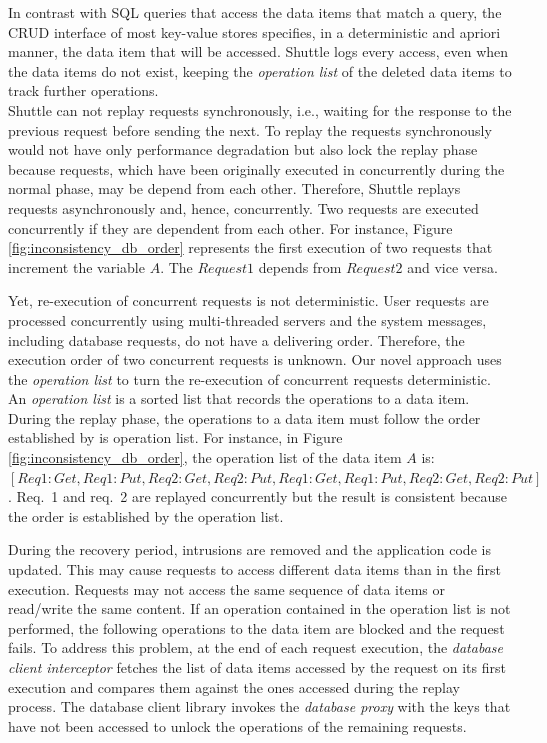 In contrast with SQL queries that access the data items that match a query, the \ac{CRUD} interface of most key-value stores specifies, in a deterministic and apriori manner, the data item that will be accessed. Shuttle logs every access, even when the data items do not exist, keeping the \emph{operation list} of the deleted data items to track further operations.\\


Shuttle can not replay requests synchronously, i.e., waiting for the response to the previous request before sending the next. To replay the requests synchronously would not have only performance degradation but also lock the replay phase because requests, which have been originally executed in concurrently during the normal phase, may be depend from each other. Therefore, Shuttle replays requests asynchronously and, hence, concurrently. Two requests are executed concurrently if they are dependent from each other. For instance, Figure \ref{fig:inconsistency_db_order} represents the first execution of two requests that increment the variable $A$. The $Request 1$ depends from $Request 2$ and vice versa. 

Yet, re-execution of concurrent requests is not deterministic. User requests are processed concurrently using multi-threaded servers and the system messages, including database requests, do not have a delivering order. Therefore, the execution order of two concurrent requests is unknown. Our novel approach uses the \emph{operation list} to turn the re-execution of concurrent requests deterministic. An \emph{operation list} is a sorted list that records the operations to a data item. During the replay phase, the operations to a data item must follow the order established by is operation list. For instance, in Figure \ref{fig:inconsistency_db_order}, the operation list of the data item $A$ is: $[Req1:Get, Req1:Put, Req2:Get, Req2:Put, Req1:Get, Req1:Put, Req2:Get, Req2:Put]$. {Req.~1} and {req.~2} are replayed concurrently but the result is consistent because the order is established by the operation list.

During the recovery period, intrusions are removed and the application code is updated. This may cause requests to access different data items than in the first execution. Requests may not access the same sequence of data items or read/write the same content. If an operation contained in the operation list is not performed, the following operations to the data item are blocked and the request fails. To address this problem, at the end of each request execution, the \textit{database client interceptor} fetches the list of data items accessed by the request on its first execution and compares them against the ones accessed during the replay process. The database client library invokes the \emph{database proxy} with the keys that have not been accessed to unlock the operations of the remaining requests. 

